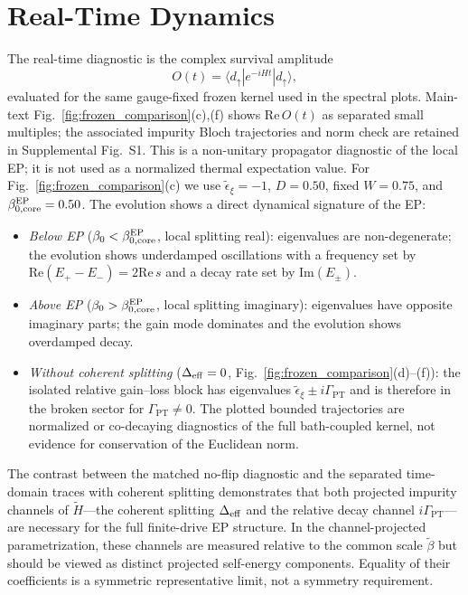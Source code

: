 \documentclass[%
  aps,prb,reprint,amsmath,amssymb,superscriptaddress,longbibliography,floatfix
]{revtex4-2}
\newcommand{\Htilde}{\tilde{H}}
\newcommand{\teps}{\tilde{\epsilon}_{\xi}}
\newcommand{\tb}{\tilde{\beta}}          %
\newcommand{\gb}{\beta_0}               %
\newcommand{\Gpt}{\Gamma_{\mathrm{PT}}}   %
\newcommand{\Deff}{\Delta_{\rm eff}}     %
\begin{document}
\section{Real-Time Dynamics}
\label{sec:dynamics}

The real-time diagnostic is the complex survival amplitude
\begin{equation}
O(t)=\langle d_\uparrow|e^{-iHt}|d_\uparrow\rangle ,
\label{eq:survival_amplitude}
\end{equation}
evaluated for the same gauge-fixed frozen kernel used in the spectral
plots.  Main-text Fig.~\ref{fig:frozen_comparison}(c),(f) shows
$\mathrm{Re}\,O(t)$ as separated small multiples; the associated impurity
Bloch trajectories and norm check are retained in Supplemental Fig.~S1.
This is a non-unitary
propagator diagnostic of the local EP; it is not used as a normalized
thermal expectation value.  For Fig.~\ref{fig:frozen_comparison}(c) we use
$\teps=-1$, $D=0.50$, fixed $W=0.75$, and
$\beta_{0,{\rm core}}^{\rm EP}=0.50$.  The evolution shows a direct dynamical
signature of the EP:

\begin{itemize}
\item \emph{Below EP} ($\gb<\beta_{0,{\rm core}}^{\rm EP}$, local splitting real):
  eigenvalues are non-degenerate; the evolution shows underdamped
  oscillations with a frequency set by $\mathrm{Re}(E_+-E_-)=2\mathrm{Re}\,s$
  and a decay rate set by $\mathrm{Im}(E_\pm)$.

\item \emph{Above EP} ($\gb>\beta_{0,{\rm core}}^{\rm EP}$, local splitting imaginary):
  eigenvalues have opposite imaginary parts; the gain mode
  dominates and the evolution shows overdamped decay.

\item \emph{Without coherent splitting}
  ($\Deff=0$, Fig.~\ref{fig:frozen_comparison}(d)--(f)):
  the isolated relative gain--loss block has eigenvalues
  $\teps\pm i\Gpt$ and is therefore in the broken sector for
  $\Gpt\neq0$.  The plotted bounded trajectories are normalized or
  co-decaying diagnostics of the full bath-coupled kernel, not evidence
  for conservation of the Euclidean norm.
\end{itemize}

The contrast between the matched no-flip diagnostic and the separated
time-domain traces with coherent splitting demonstrates that both projected
impurity channels of $\Htilde$---the coherent splitting $\Deff$ and the
relative decay channel $i\Gpt$---are necessary for the full finite-drive
EP structure.  In the channel-projected parametrization, these channels are measured
relative to the common scale $\tb$ but should be viewed as distinct
projected self-energy components.  Equality of their coefficients is a
symmetric representative limit, not a symmetry requirement.
\end{document}
